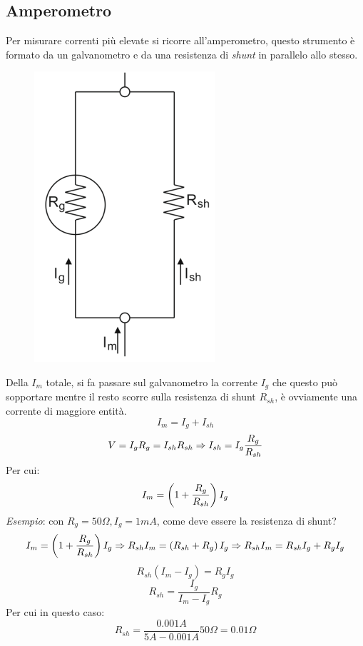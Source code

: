 \documentclass[a4paper, 15pt]{article}
\begin{document}
\subsection{Amperometro}	
\begin{adjustwidth}{2in}{}
		Per misurare correnti più elevate si ricorre all'amperometro, questo strumento è formato da un galvanometro e da una resistenza di \textit{shunt} in parallelo allo stesso.
\begin{figure}[H]
	\centering
	\includegraphics[width=0.3\linewidth]{fig/screenshot002}
	\label{fig:screenshot002}
\end{figure}
		Della $I_m$ totale, si fa passare sul galvanometro la corrente $I_g$ che questo può sopportare mentre il resto scorre sulla resistenza di shunt $R_{sh}$, è ovviamente una corrente di maggiore entità.
		\[I_m = I_g + I_{sh}\]
		\[V = I_gR_g = I_{sh}R_{sh}\Rightarrow I_{sh} = I_g{R_g\over R_{sh}}\]
		Per cui:
		\[I_m = \left(1+{R_g\over R_{sh}}\right)I_g\]
		\textit{Esempio}: con $R_g= 50\Omega, I_g = 1mA$, come deve essere la resistenza di shunt? 
		\[I_m = \left(1+{R_g\over R_{sh}}\right)I_g \Rightarrow R_{sh}I_m = \left(R_{sh}+R_g\right)I_g \Rightarrow R_{sh}I_m = R_{sh}I_g+R_gI_g \] 
		\[R_{sh}(I_m-I_g) = R_gI_g \]
		\[R_{sh} = \dfrac{I_g}{I_m-I_g}R_g\]
		Per cui in questo caso:
		\[R_{sh} = \dfrac{0.001 A}{5 A-0.001 A}50\Omega = 0.01\Omega\]
\end{adjustwidth}
\newpage		
\end{document}
